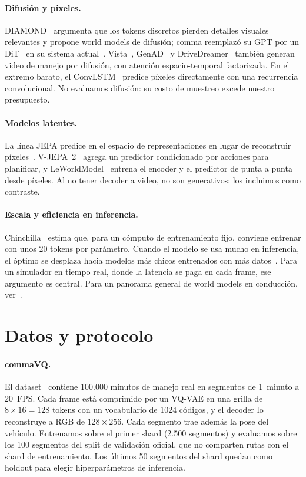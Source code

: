 \documentclass[10pt,twocolumn,a4paper]{article}
\begin{document}
\paragraph{Difusión y píxeles.} DIAMOND~\cite{alonso2024diamond} argumenta que los tokens discretos pierden detalles visuales relevantes y propone world models de difusión; comma reemplazó su GPT por un DiT~\cite{peebles2023dit} en su sistema actual~\cite{goff2025learning}. Vista~\cite{gao2024vista}, GenAD~\cite{yang2024genad} y DriveDreamer~\cite{wang2023drivedreamer} también generan video de manejo por difusión, con atención espacio-temporal factorizada. En el extremo barato, el ConvLSTM~\cite{shi2015convlstm} predice píxeles directamente con una recurrencia convolucional. No evaluamos difusión: su costo de muestreo excede nuestro presupuesto.

\paragraph{Modelos latentes.} La línea JEPA predice en el espacio de representaciones en lugar de reconstruir píxeles~\cite{bardes2024vjepa}. V-JEPA~2~\cite{assran2025vjepa2} agrega un predictor condicionado por acciones para planificar, y LeWorldModel~\cite{maes2026lewm} entrena el encoder y el predictor de punta a punta desde píxeles. Al no tener decoder a video, no son generativos; los incluimos como contraste.

\paragraph{Escala y eficiencia en inferencia.} Chinchilla~\cite{hoffmann2022chinchilla} estima que, para un cómputo de entrenamiento fijo, conviene entrenar con unos 20 tokens por parámetro. Cuando el modelo se usa mucho en inferencia, el óptimo se desplaza hacia modelos más chicos entrenados con más datos~\cite{sardana2024beyond}. Para un simulador en tiempo real, donde la latencia se paga en cada frame, ese argumento es central. Para un panorama general de world models en conducción, ver~\cite{guan2024survey}.

\section{Datos y protocolo}
\label{sec:protocolo}

\paragraph{commaVQ.} El dataset~\cite{commavq} contiene 100.000 minutos de manejo real en segmentos de 1~minuto a 20~FPS. Cada frame está comprimido por un VQ-VAE en una grilla de $8\times16=128$ tokens con un vocabulario de 1024 códigos, y el decoder lo reconstruye a RGB de $128\times256$. Cada segmento trae además la pose del vehículo. Entrenamos sobre el primer shard (2.500 segmentos) y evaluamos sobre los 100 segmentos del split de validación oficial, que no comparten rutas con el shard de entrenamiento. Los últimos 50 segmentos del shard quedan como holdout para elegir hiperparámetros de inferencia.
\end{document}
